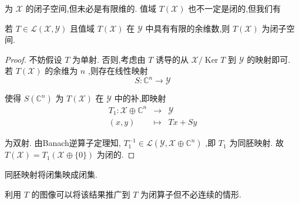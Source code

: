 \documentclass[lang=cn,newtx,10pt,scheme=chinese,thmcnt=chapter]{elegantbook}
\begin{document}
为 \(\mathcal{X}\) 的闭子空间,但未必是有限维的. 值域 \(T\left( \mathcal{X}\right)\) 也不一定是闭的,但我们有
\begin{lemma}
   若 \(T \in  \mathcal{L}\left( {\mathcal{X},\mathcal{Y}}\right)\) 且值域 \(T\left( \mathcal{X}\right)\) 在 \(\mathcal{Y}\) 中具有有限的余维数,则 \(T\left( \mathcal{X}\right)\) 为闭子空间.  \
\end{lemma}
\begin{proof}
    不妨假设 \(T\) 为单射. 否则,考虑由 \(T\) 诱导的从 \(\mathcal{X}/\operatorname{Ker}T\) 到 \(\mathcal{Y}\) 的映射即可. 若 \(T\left( \mathcal{X}\right)\) 的余维为 \(n\) ,则存在线性映射
\begin{equation*}
S : {\mathbb{C}}^{n} \rightarrow  \mathcal{Y}
\end{equation*}

使得 \(S\left( {\mathbb{C}}^{n}\right)\) 为 \(T\left( \mathcal{X}\right)\) 在 \(\mathcal{Y}\) 中的补,即映射
\begin{equation*}
\begin{matrix} {T}_{1} : \mathcal{X} \oplus  {\mathbb{C}}^{n} &  \rightarrow  & \mathcal{Y} \\  \left( {x,y}\right) &  \mapsto  & {Tx} + {Sy} \end{matrix}
\end{equation*}

为双射. 由Banach逆算子定理知, \({T}_{1}^{-1} \in  \mathcal{L}\left( {\mathcal{Y},\mathcal{X} \oplus  {\mathbb{C}}^{n}}\right)\) ,即 \({T}_{1}\) 为同胚映射. 故 \(T\left( \mathcal{X}\right)  = {T}_{1}\left( {\mathcal{X}\oplus \{ 0\} }\right)\) 为闭的.
\end{proof}
\begin{note}
同胚映射将闭集映成闭集.

    利用 \(T\) 的图像可以将该结果推广到 \(T\) 为闭算子但不必连续的情形.
\end{note}
\end{document}
